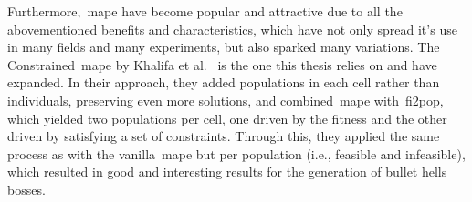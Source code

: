 
Furthermore,~\acrshort{mape} have become popular and attractive due to all the abovementioned benefits and characteristics, which have not only spread it's use in many fields and many experiments, but also sparked many variations. The Constrained~\acrshort{mape} by Khalifa et al.~\cite{Khalifa2018} is the one this thesis relies on and have expanded. In their approach, they added populations in each cell rather than individuals, preserving even more solutions, and combined~\acrshort{mape} with~\acrshort{fi2pop}, which yielded two populations per cell, one driven by the fitness and the other driven by satisfying a set of constraints. Through this, they applied the same process as with the vanilla~\acrshort{mape} but per population (i.e., feasible and infeasible), which resulted in good and interesting results for the generation of bullet hells bosses.







